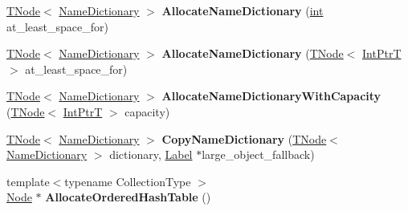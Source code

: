 \begin{DoxyCompactItemize}
\item 
\mbox{\label{classv8_1_1internal_1_1CodeStubAssembler_a4fa5646fb8025942ca437121f834be49}} 
\mbox{\hyperlink{classv8_1_1internal_1_1compiler_1_1TNode}{T\+Node}}$<$ \mbox{\hyperlink{classv8_1_1internal_1_1NameDictionary}{Name\+Dictionary}} $>$ {\bfseries Allocate\+Name\+Dictionary} (\mbox{\hyperlink{classint}{int}} at\+\_\+least\+\_\+space\+\_\+for)
\item 
\mbox{\label{classv8_1_1internal_1_1CodeStubAssembler_ae956aa9d594e2b6a9d94f89b578e0e8c}} 
\mbox{\hyperlink{classv8_1_1internal_1_1compiler_1_1TNode}{T\+Node}}$<$ \mbox{\hyperlink{classv8_1_1internal_1_1NameDictionary}{Name\+Dictionary}} $>$ {\bfseries Allocate\+Name\+Dictionary} (\mbox{\hyperlink{classv8_1_1internal_1_1compiler_1_1TNode}{T\+Node}}$<$ \mbox{\hyperlink{structv8_1_1internal_1_1IntPtrT}{Int\+PtrT}} $>$ at\+\_\+least\+\_\+space\+\_\+for)
\item 
\mbox{\label{classv8_1_1internal_1_1CodeStubAssembler_a9fc21ab1d443b4231b65d8b5a678d8c2}} 
\mbox{\hyperlink{classv8_1_1internal_1_1compiler_1_1TNode}{T\+Node}}$<$ \mbox{\hyperlink{classv8_1_1internal_1_1NameDictionary}{Name\+Dictionary}} $>$ {\bfseries Allocate\+Name\+Dictionary\+With\+Capacity} (\mbox{\hyperlink{classv8_1_1internal_1_1compiler_1_1TNode}{T\+Node}}$<$ \mbox{\hyperlink{structv8_1_1internal_1_1IntPtrT}{Int\+PtrT}} $>$ capacity)
\item 
\mbox{\label{classv8_1_1internal_1_1CodeStubAssembler_ae77e3247e0ca7b4b17ecb3698a8dcc03}} 
\mbox{\hyperlink{classv8_1_1internal_1_1compiler_1_1TNode}{T\+Node}}$<$ \mbox{\hyperlink{classv8_1_1internal_1_1NameDictionary}{Name\+Dictionary}} $>$ {\bfseries Copy\+Name\+Dictionary} (\mbox{\hyperlink{classv8_1_1internal_1_1compiler_1_1TNode}{T\+Node}}$<$ \mbox{\hyperlink{classv8_1_1internal_1_1NameDictionary}{Name\+Dictionary}} $>$ dictionary, \mbox{\hyperlink{classv8_1_1internal_1_1compiler_1_1CodeAssemblerLabel}{Label}} $\ast$large\+\_\+object\+\_\+fallback)
\item 
\mbox{\label{classv8_1_1internal_1_1CodeStubAssembler_a837b0ece3b3dcc318a18f840477cfe31}} 
{\footnotesize template$<$typename Collection\+Type $>$ }\\\mbox{\hyperlink{classv8_1_1internal_1_1compiler_1_1Node}{Node}} $\ast$ {\bfseries Allocate\+Ordered\+Hash\+Table} ()

\end{DoxyCompactItemize}

